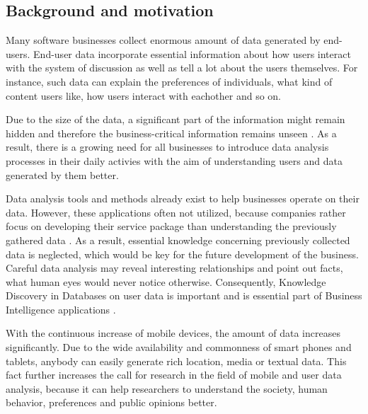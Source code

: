 \subsection{Background and motivation}
	Many software businesses collect enormous amount of data generated by end-users. End-user data incorporate essential information about how users interact with the system of discussion as well as tell a lot about the users themselves. For instance, such data can explain the preferences of individuals, what kind of content users like, how users interact with eachother and so on.
    
    Due to the size of the data, a significant part of the information might remain hidden and therefore the business-critical information remains unseen \cite{inmon2007tapping, wegener2010integrating, introtodatamining}. As a result, there is a growing need for all businesses to introduce data analysis processes in their daily activies with the aim of understanding users and data generated by them better.
	
	Data analysis tools and methods already exist to help businesses operate on their data. However, these applications often not utilized, because companies rather focus on developing their service package than understanding the previously gathered data \cite{inmon2007tapping}. As a result, essential knowledge concerning previously collected data is neglected, which would be key for the future development of the business. Careful data analysis may reveal interesting relationships and point out facts, what human eyes would never notice otherwise. Consequently, Knowledge Discovery in Databases on user data is important and is essential part of Business Intelligence applications \cite{zarsky2002mine}. 

    With the continuous increase of mobile devices, the amount of data increases significantly. Due to the wide availability and commonness of smart phones and tablets, anybody can easily generate rich location, media or textual data. This fact further increases the call for research in the field of mobile and user data analysis, because it can help researchers to understand the society, human behavior, preferences and public opinions better.

